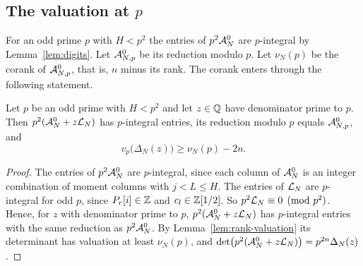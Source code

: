 \subsection{The valuation at $p$}
For an odd prime $p$ with $H<p^2$ the entries of $p^2\mathcal A^0_N$ are $p$-integral by Lemma~\ref{lem:digits}.
Let $\mathcal A^0_{N,p}$ be its reduction modulo $p$. Let $\nu_N(p)$ be the corank of $\mathcal A^0_{N,p}$, that is, $n$
minus its rank. The corank enters through the following statement.

\begin{proposition}\label{prop:valuation}
Let $p$ be an odd prime with $H<p^2$ and let $z\in\mathbb Q$ have denominator prime to $p$. Then
$p^2(\mathcal A^0_N+z\mathcal L_N)$ has $p$-integral entries, its reduction modulo $p$ equals $\mathcal A^0_{N,p}$, and
\[
 v_p\bigl(\Delta_N(z)\bigr)\ge\nu_N(p)-2n .
\]
\end{proposition}

\begin{proof}
The entries of $p^2\mathcal A^0_N$ are $p$-integral, since each column of $\mathcal A^0_N$ is an integer combination of
moment columns with $j<L\le H$. The entries of $\mathcal L_N$ are $p$-integral for odd $p$, since $P_r[i]\in\mathbb Z$
and $c_l\in\mathbb Z[1/2]$. So $p^2\mathcal L_N\equiv0\pmod{p^2}$. Hence, for $z$ with denominator prime to $p$,
$p^2(\mathcal A^0_N+z\mathcal L_N)$ has $p$-integral entries with the same reduction as $p^2\mathcal A^0_N$. By
Lemma~\ref{lem:rank-valuation} its determinant has valuation at least $\nu_N(p)$, and
$\det\bigl(p^2(\mathcal A^0_N+z\mathcal L_N)\bigr)=p^{2n}\Delta_N(z)$.
\end{proof}

